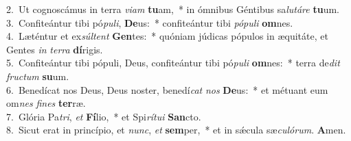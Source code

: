 {2.~}Ut cognoscámus in terra \textit{vi}\textit{am} \textbf{tu}am,~* in ómnibus Géntibus sa\textit{lu}\textit{tá}\textit{re} \textbf{tu}um.\\
{3.~}Confiteántur tibi pó\textit{pu}\textit{li}, \textbf{De}us:~* confiteántur tibi \textit{pó}\textit{pu}\textit{li} \textbf{om}nes.\\
{4.~}Læténtur et ex\textit{súl}\textit{tent} \textbf{Gen}tes:~* quóniam júdicas pópulos in æquitáte, et Gentes \textit{in} \textit{ter}\textit{ra} \textbf{dí}rigis.\\
{5.~}Confiteántur tibi pópuli, Deus, confiteántur tibi pó\textit{pu}\textit{li} \textbf{om}nes:~* terra de\textit{dit} \textit{fru}\textit{ctum} \textbf{su}um.\\
{6.~}Benedícat nos Deus, Deus noster, benedí\textit{cat} \textit{nos} \textbf{De}us:~* et métuant eum om\textit{nes} \textit{fi}\textit{nes} \textbf{ter}ræ.\\
{7.~}Glória Pa\textit{tri}, \textit{et} \textbf{Fí}lio,~* et Spi\textit{rí}\textit{tu}\textit{i} \textbf{San}cto.\\
{8.~}Sicut erat in princípio, et \textit{nunc}, \textit{et} \textbf{sem}per,~* et in sǽcula sæ\textit{cu}\textit{ló}\textit{rum}. \textbf{A}men.\\
